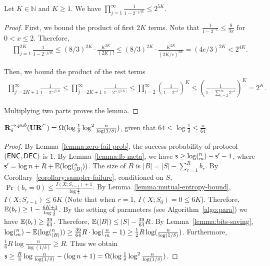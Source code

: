 \begin{lemma}\label{lemma:Pochhammer}
  Let $K\in \mathbb{N}$ and $K\ge 1$. We have $\prod_{j=1}^{\infty} \frac{1}{1-2^{-j/K}}\le 2^{5K}$.
\end{lemma}

\begin{proof}
  First, we bound the product of first $2K$ terms. Note that $\frac{1}{1-2^{-x}}\le \frac{8}{3x}$ for $0<x\le 2$. Therefore, 
  \begin{align}
    \prod_{j=1}^{2K}\frac{1}{1-2^{-j/K}}
    \le (8/3)^{2K}\cdot \frac{K^{2K}}{(2K)!}
    \le (8/3)^{2K}\cdot \frac{K^{2K}}{(2K/e)^{2K}}
    = (4e/3)^{2K}
    < 2^{4K}. 
  \end{align}
  
  Then, we bound the product of the rest terms
  \begin{align}
    \prod_{j=2K+1}^{\infty}\frac{1}{1-2^{-j/K}} 
    \le \prod_{j=2K+1}^{\infty}\frac{1}{1-2^{-\lfloor j/K \rfloor}} 
    \le \prod_{i=2}^{\infty}\left( \frac{1}{1-2^{-i}}\right)^K 
    \le \left( \frac{1}{1-\sum_{i=2}^{\infty}2^{-i}}\right)^K
    = 2^K.
  \end{align}
  
  Multiplying two parts proves the lemma.
\end{proof}

\begin{theorem}
  $\mathbf{R}^{\rightarrow,pub}_\delta(\mathbf{UR}^\subset) = \Omega(\log \frac{1}{\delta}\log^2 \frac{n}{\log (1/\delta)} )$, given that $64 \le \log \frac{1}{\delta} \le \frac{n}{64}$.
\end{theorem}

\begin{proof}
  By Lemma~\ref{lemma:zero-fail-prob}, the success probability of protocol $(\textsf{ENC},\textsf{DEC})$ is $1$. 
  By Lemma~\ref{lemma:lb-meta}, we have $\textsf{s}\ge \log (^n_m) - \textsf{s}' -1$, where $\textsf{s}'=\log n + R+ \operatorname*{\mathbb{E}}(\log (^n_{|B|}))$. 
  The size of $B$ is $|B|=|S|-\sum_{r=1}^{R}{b_r}$.
  By Corollary~\ref{corollary:sampler-failure}, conditioned on $S$, $\Pr(b_r=0)\le \frac{I(X;S_{r-1})+1}{\log\frac{1}{\delta}}$. 
  By Lemma~\ref{lemma:mutual-entropy-bound}, $I(X;S_{r-1})\le 6K$ (Note that when $r=1$, $I(X;S_0)=0\le 6K$). 
  Therefore, $\operatorname*{\mathbb{E}}(b_r)\ge 1-\frac{6K+1}{\log\frac{1}{\delta}}$.
  By the setting of parameters (see Algorithm~\ref{algo:para}) we have $\operatorname*{\mathbb{E}}(b_r)\ge \frac{39}{64}$. Therefore, $\operatorname*{\mathbb{E}}(|B|)\le |S|-\frac{39}{64}R$. 
  By Lemma~\ref{lemma:bits-saving}, $\log (^n_m)-\operatorname*{\mathbb{E}}(\log (^n_{|B|}))\ge \frac{39}{64}R\cdot \log (\frac{n}{m}-1) \ge \frac{1}{2}R\log (\frac{n}{\log(1/\delta)})$. 
  Furthermore, $\frac{1}{6}R\log \frac{n}{\log (1/\delta)} \ge R$.
  Thus we obtain $\textsf{s} \ge \frac{R}{3}\log \frac{n}{\log(1/\delta)} -(\log n + 1)  =\Omega(\log \frac{1}{\delta}\log^2 \frac{n}{\log (1/\delta)} )$.
\end{proof}